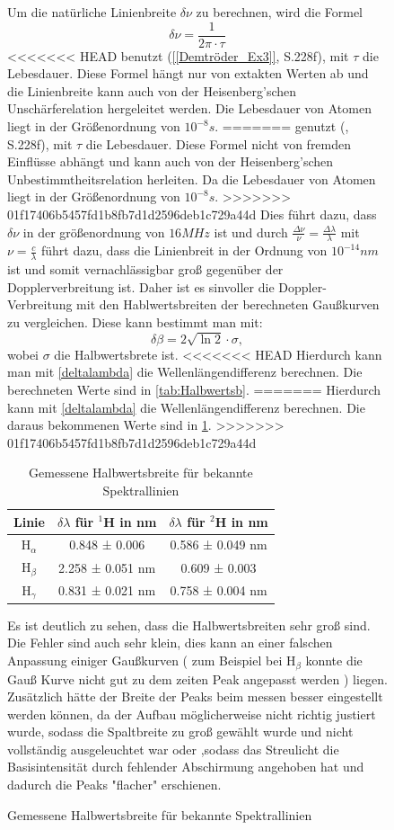 \begin{figure}
Um die natürliche Linienbreite $\delta\nu$ zu berechnen, wird die Formel
\begin{equation}
    \delta \nu = \frac{1}{2\pi \cdot \tau}
\end{equation}
<<<<<<< HEAD
benutzt (\cref{[Demtröder_Ex3]}, S.228f), mit $\tau$ die Lebesdauer. 
Diese Formel hängt nur von extakten Werten ab und die Linienbreite kann auch von der Heisenberg'schen Unschärferelation hergeleitet werden.  
Die Lebesdauer von Atomen liegt in der Größenordnung von $10^{-8}s$. 
=======
genutzt (\cite{Demtröder_Ex3}, S.228f), mit $\tau$ die Lebesdauer. 
Diese Formel nicht von fremden Einflüsse abhängt und kann auch von der Heisenberg'schen Unbestimmtheitsrelation herleiten.  
Da die Lebesdauer von Atomen liegt in der Größenordnung von $10^{-8}s$. 
>>>>>>> 01f17406b5457fd1b8fb7d1d2596deb1c729a44d
Dies führt dazu, dass $\delta\nu$ in der größenordnung von $16MHz$  ist und durch $\frac{\Delta\nu}{\nu} = \frac{\Delta\lambda}{\lambda}$ mit $\nu = \frac{c}{\lambda}$ führt dazu, dass die Linienbreit in der Ordnung von $10^{-14}nm$ ist und somit vernachlässigbar groß gegenüber der Dopplerverbreitung ist.
Daher ist es sinvoller die Doppler-Verbreitung mit den Hablwertsbreiten der berechneten Gaußkurven zu vergleichen.
Diese kann bestimmt man mit:
\begin{equation}
    \delta\beta = 2\sqrt{\ln{2}}\cdot \sigma,
\end{equation}
wobei $\sigma$ die Halbwertsbrete ist.
<<<<<<< HEAD
Hierdurch kann man mit \cref{deltalambda} die Wellenlängendifferenz berechnen.
Die berechneten Werte sind in \cref{tab:Halbwertsb}.
=======
Hierdurch kann mit \cref{deltalambda} die Wellenlängendifferenz berechnen.
Die daraus bekommenen Werte sind in \cref{tab:gemhalb}.
>>>>>>> 01f17406b5457fd1b8fb7d1d2596deb1c729a44d

\begin{table}[htbp]
    \centering
    \begin{tabular}{|c|c|c|}
    Linie & $\delta\lambda$ für $^1$H in nm & $\delta\lambda$ für $^2$H in nm \\
    \hline
        H$_\alpha$ & 0.848 ± 0.006 & 0.586 ± 0.049 nm \\
        H$_\beta$ & 2.258 ± 0.051 nm & 0.609 ± 0.003 \\
        H$_\gamma$ & 0.831 ± 0.021 nm & 0.758 ± 0.004 nm
    \end{tabular}
    \caption{Gemessene Halbwertsbreite für bekannte Spektrallinien}
    \label{tab:gemhalb}
\end{table}
Es ist deutlich zu sehen, dass die Halbwertsbreiten sehr groß sind. 
Die Fehler sind auch sehr klein, dies kann an einer falschen Anpassung einiger Gaußkurven ( zum Beispiel bei H$_\beta$ konnte die Gauß Kurve nicht gut zu dem zeiten Peak angepasst werden ) liegen.
Zusätzlich hätte der Breite der Peaks beim messen besser eingestellt werden können, da der Aufbau möglicherweise nicht richtig justiert wurde, sodass die Spaltbreite zu groß gewählt wurde und nicht vollständig ausgeleuchtet war oder ,sodass das Streulicht die Basisintensität durch fehlender Abschirmung angehoben hat und dadurch die Peaks "flacher" erschienen.



\end{figure}
